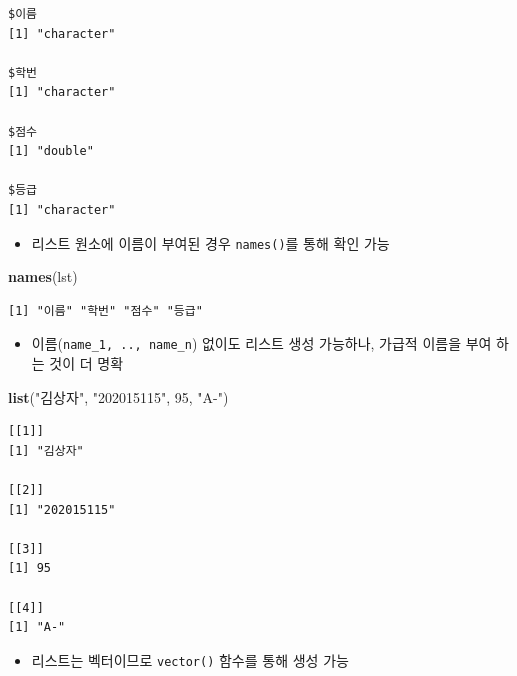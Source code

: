 \documentclass[
  11pt,
]{krantz}
\newenvironment{Shaded}{\begin{snugshade}}{\end{snugshade}}
\newcommand{\DecValTok}[1]{\textcolor[rgb]{0.06,0.06,0.06}{#1}}
\newcommand{\KeywordTok}[1]{\textcolor[rgb]{0.27,0.27,0.27}{\textbf{#1}}}
\newcommand{\NormalTok}[1]{#1}
\newcommand{\StringTok}[1]{\textcolor[rgb]{0.5,0.5,0.5}{#1}}
\providecommand{\tightlist}{%
  \setlength{\itemsep}{0pt}\setlength{\parskip}{0pt}}
\begin{document}
\begin{verbatim}
$이름
[1] "character"

$학번
[1] "character"

$점수
[1] "double"

$등급
[1] "character"
\end{verbatim}

\normalsize

\begin{itemize}
\tightlist
\item
  리스트 원소에 이름이 부여된 경우 \texttt{names()}를 통해 확인 가능
\end{itemize}

\footnotesize

\begin{Shaded}
\begin{Highlighting}[]
\KeywordTok{names}\NormalTok{(lst)}
\end{Highlighting}
\end{Shaded}

\begin{verbatim}
[1] "이름" "학번" "점수" "등급"
\end{verbatim}

\normalsize

\begin{itemize}
\tightlist
\item
  이름(\texttt{name\_1,\ ..,\ name\_n}) 없이도 리스트 생성 가능하나, 가급적 이름을 부여 하는 것이 더 명확
\end{itemize}

\footnotesize

\begin{Shaded}
\begin{Highlighting}[]
\KeywordTok{list}\NormalTok{(}\StringTok{"김상자"}\NormalTok{, }\StringTok{"202015115"}\NormalTok{, }\DecValTok{95}\NormalTok{, }\StringTok{"A-"}\NormalTok{)}
\end{Highlighting}
\end{Shaded}

\begin{verbatim}
[[1]]
[1] "김상자"

[[2]]
[1] "202015115"

[[3]]
[1] 95

[[4]]
[1] "A-"
\end{verbatim}

\normalsize

\begin{itemize}
\tightlist
\item
  리스트는 벡터이므로 \texttt{vector()} 함수를 통해 생성 가능
\end{itemize}
\end{document}
